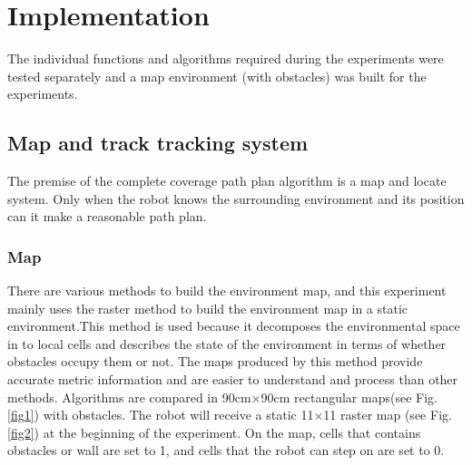 \documentclass[conference]{IEEEtran}
\begin{document}
\section{Implementation}
The individual functions and algorithms required during the experiments were tested separately and a map environment (with obstacles) was built for the experiments.


\subsection{Map and track tracking system}

The premise of the complete coverage path plan algorithm is a map and locate system. Only when the robot knows the surrounding environment and its position can it make a reasonable path plan.

\subsubsection{Map}

There are various methods to build the environment map, and this experiment mainly uses the raster method\cite{hart1968formal} to build the environment map in a static environment.This method is used because it decomposes the environmental space in to local cells and describes the state of the environment in terms of whether obstacles occupy them or not. The maps produced by this method provide accurate metric information and are easier to understand and process than other methods. Algorithms are compared in 90cm×90cm rectangular maps(see Fig.\ref{fig1}) with obstacles. The robot will receive a static 11×11 raster map (see Fig.\ref{fig2}) at the beginning of the experiment. On the map, cells that contains obstacles or wall are set to 1, and cells that the robot can step on are set to 0.
\end{document}
